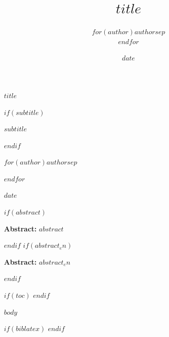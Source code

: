 \documentclass[11pt]{article}
\title{$title$}
\author{$for(author)$$author$$sep$ \\ $endfor$}
\date{$date$}
\renewcommand{\maketitle}{
  \begin{center}
  \vspace*{1cm}
  
  \begin{minipage}{\textwidth}
  \centering
  \fontsize{20}{26}\selectfont\textbf{$title$}
  \end{minipage}
  
  \vspace{0.4cm}
  
  $if(subtitle)$
  \begin{minipage}{\textwidth}
  \centering
  \fontsize{13}{16}\selectfont\itshape $subtitle$
  \end{minipage}
  $endif$
  
  \vspace{0.6cm}
  
  \begin{minipage}{\textwidth}
  \centering
  \Large
  $for(author)$$author$$sep$ \par $endfor$
  \end{minipage}
  
  \vspace{0.6cm}
  
  \Large $date$
  
  \end{center}
  \vspace{1cm}
}
\begin{document}
\maketitle
\thispagestyle{firstpage}

$if(abstract)$
\begin{center}
\begin{minipage}{0.85\textwidth}
\noindent \textbf{Abstract:} $abstract$
\end{minipage}
\end{center}
\vspace{1cm}
$endif$
$if(abstract_en)$
\begin{center}
\begin{minipage}{0.85\textwidth}
\noindent \textbf{Abstract:} $abstract_en$
\end{minipage}
\end{center}
\vspace{1cm}
$endif$

$if(toc)$
\tableofcontents
\clearpage
$endif$

\pagestyle{fancy}

$body$

$if(biblatex)$ 
$endif$ 
\end{document}
